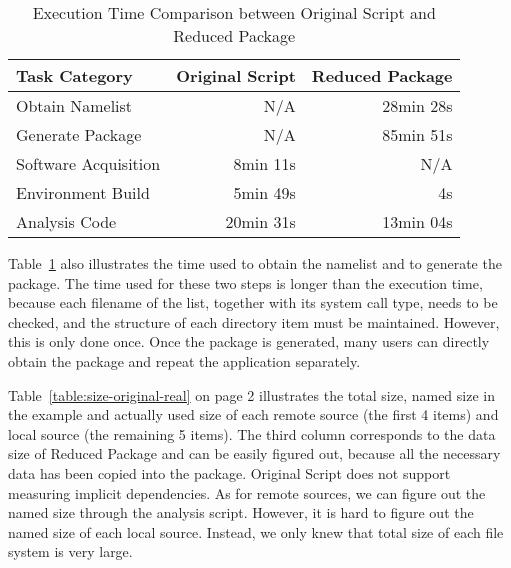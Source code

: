 \begin{table}
    \centering
    \begin{tabular}{lrr}
    \hline
    \bf Task Category & \bf Original Script & \bf Reduced Package \\ \hline
    Obtain Namelist & N/A & 28min 28s \\ \hline
    Generate Package & N/A & 85min 51s \\ \hline
    Software Acquisition & 8min 11s & N/A \\ \hline
    Environment Build & 5min 49s  & 4s \\ \hline
    Analysis Code & 20min 31s & 13min 04s \\ \hline
    \end{tabular}
    \caption{Execution Time Comparison between Original Script and Reduced Package}
    \label{table:time-2nd3rd}
\end{table}    

Table~\ref{table:time-2nd3rd} also illustrates the time used to
obtain the namelist and to generate the package. 
The time used for these two steps is longer than the execution time,
because each filename of the list, together with its system call type, needs to be checked, and the structure of each directory item must be maintained.
However, 
this is only done once.
Once the package is
generated, many users can directly obtain the package and repeat the application 
separately. 

Table~\ref{table:size-original-real} on page 2 illustrates the total size, named size in the example and actually used size of each remote source (the first 4 items) and local source (the remaining 5 items).
The third column corresponds to the data size of Reduced Package and can be easily figured out, because all the necessary data has been copied into the package.
Original Script does not support measuring implicit dependencies. As for remote sources, we can figure out the named size through the analysis script. However, it is hard to figure out the named size of each local source. 
Instead, we only knew that total size of each file system is very large.

